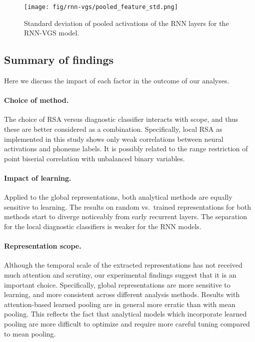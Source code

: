 \begin{figure}[htb]
  \centering
  \texttt{[image: fig/rnn-vgs/pooled\_feature\_std.png]}
  \caption{Standard deviation of pooled activations of the RNN layers for the RNN-VGS
    model.}
  \label{fig:std-rnn-vgs}
\end{figure}

\subsection{Summary of findings}
\label{sec:results-summary}

Here we discuss the impact of each factor in the outcome of our
analyses.
\paragraph{Choice of method.}
The choice of RSA versus diagnostic classifier interacts with scope,
and thus these are better considered as a combination. Specifically,
local RSA as implemented in this study shows only weak
correlations between neural activations and phoneme labels. It is
possibly related to the range restriction of point biserial
correlation with unbalanced binary variables. 

\paragraph{Impact of learning.}
Applied to the global representations, both analytical methods
are equally sensitive to learning. The results on random vs.\
trained representations for both methods start to diverge noticeably
from early recurrent layers. The separation for the local diagnostic
classifiers is weaker for the RNN models.


\paragraph{Representation scope.}
Although the temporal scale of the extracted representations
has not received much attention
and scrutiny, our experimental findings suggest that it is an
important choice. Specifically, global representations are more
sensitive to learning, and more consistent across different analysis
methods. Results with attention-based learned pooling are in general more
erratic than with mean pooling. This reflects the fact that analytical
models which incorporate learned pooling are more difficult to optimize
and require more careful tuning compared to mean pooling.

